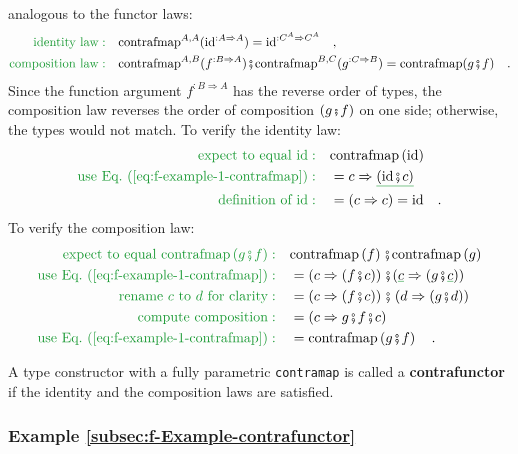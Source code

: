 analogous to the functor laws:
\begin{align*}
{\color{greenunder}\text{identity law}:}\quad & \text{contrafmap}^{A,A}(\text{id}^{:A\Rightarrow A})=\text{id}^{:C^{A}\Rightarrow C^{A}}\quad,\\
{\color{greenunder}\text{composition law}:}\quad & \text{contrafmap}^{A,B}(f^{:B\Rightarrow A})\bef\text{contrafmap}^{B,C}(g^{:C\Rightarrow B})=\text{contrafmap}(g\bef f)\quad.
\end{align*}
Since the function argument $f^{:B\Rightarrow A}$ has the reverse
order of types, the composition law reverses the order of composition
$\left(g\bef f\right)$ on one side; otherwise, the types would not
match. To verify the identity law:
\begin{align*}
{\color{greenunder}\text{expect to equal }\text{id}:}\quad & \text{contrafmap}\left(\text{id}\right)\\
{\color{greenunder}\text{use Eq.~(\ref{eq:f-example-1-contrafmap})}:}\quad & =c\Rightarrow\gunderline{(\text{id}\bef c)}\\
{\color{greenunder}\text{definition of }\text{id}:}\quad & =\left(c\Rightarrow c\right)=\text{id}\quad.
\end{align*}
To verify the composition law:
\begin{align*}
{\color{greenunder}\text{expect to equal }\text{contrafmap}\left(g\bef f\right):}\quad & \text{contrafmap}\left(f\right)\bef\text{contrafmap}\left(g\right)\\
{\color{greenunder}\text{use Eq.~(\ref{eq:f-example-1-contrafmap})}:}\quad & =\left(c\Rightarrow(f\bef c)\right)\bef(\gunderline c\Rightarrow(g\bef\gunderline c))\\
{\color{greenunder}\text{rename }c\text{ to }d\text{ for clarity}:}\quad & =\left(c\Rightarrow(f\bef c)\right)\bef\left(d\Rightarrow(g\bef d)\right)\\
{\color{greenunder}\text{compute composition}:}\quad & =\left(c\Rightarrow g\bef f\bef c\right)\\
{\color{greenunder}\text{use Eq.~(\ref{eq:f-example-1-contrafmap})}:}\quad & =\text{contrafmap}\left(g\bef f\right)\quad.
\end{align*}

A type constructor with a fully parametric \lstinline!contramap!
is called a \textbf{contrafunctor} if the identity
and the composition laws are satisfied.

\subsubsection{Example \label{subsec:f-Example-contrafunctor}\ref{subsec:f-Example-contrafunctor}}

